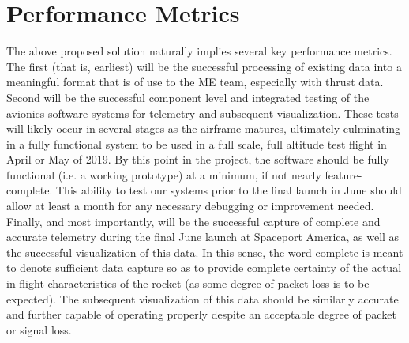 \documentclass[onecolumn, draftclsnofoot,10pt, compsoc]{IEEEtran}
\begin{document}
\section{Performance Metrics}
The above proposed solution naturally implies several key performance metrics.
The first (that is, earliest) will be the successful processing of existing data into a meaningful format that is of use to the ME team, especially with thrust data.
Second will be the successful component level and integrated testing of the avionics software systems for telemetry and subsequent visualization. 
These tests will likely occur in several stages as the airframe matures, ultimately culminating in a fully functional system to be used in a full scale, full altitude test flight in April or May of 2019.
By this point in the project, the software should be fully functional (i.e. a working prototype) at a minimum, if not nearly feature-complete.
This ability to test our systems prior to the final launch in June should allow at least a month for any necessary debugging or improvement needed.
Finally, and most importantly, will be the successful capture of complete and accurate telemetry during the final June launch at Spaceport America, as well as the successful visualization of this data.
In this sense, the word complete is meant to denote sufficient data capture so as to provide complete certainty of the actual in-flight characteristics of the rocket (as some degree of packet loss is to be expected).
The subsequent visualization of this data should be similarly accurate and further capable of operating properly despite an acceptable degree of packet or signal loss.
\end{document}
